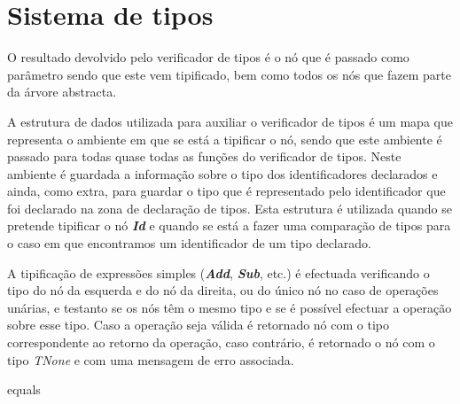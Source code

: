 \section{Sistema de tipos}

O resultado devolvido pelo verificador de tipos é o nó que é passado como parâmetro sendo que este vem tipificado, bem como todos os nós que fazem parte da árvore abstracta.

A estrutura de dados utilizada para auxiliar o verificador de tipos é um mapa que representa o ambiente em que se está a tipificar o nó, sendo que este ambiente é passado para todas quase todas as funções do verificador de tipos. Neste ambiente é guardada a informação sobre o tipo dos identificadores declarados e ainda, como extra, para guardar o tipo que é representado pelo identificador que foi declarado na zona de declaração de tipos. Esta estrutura é utilizada quando se pretende tipificar o nó \emph{\textbf{Id}} e quando se está a fazer uma comparação de tipos para o caso em que encontramos um identificador de um tipo declarado.

A tipificação de expressões simples (\emph{\textbf{Add}}, \emph{\textbf{Sub}}, etc.) é efectuada verificando o tipo do nó da esquerda e do nó da direita, ou do único nó no caso de operações unárias, e testanto se os nós têm o mesmo tipo e se é possível efectuar a operação sobre esse tipo. Caso a operação seja válida é retornado nó com o tipo correspondente ao retorno da operação, caso contrário, é retornado o nó com o tipo \emph{TNone} e com uma mensagem de erro associada.


equals


